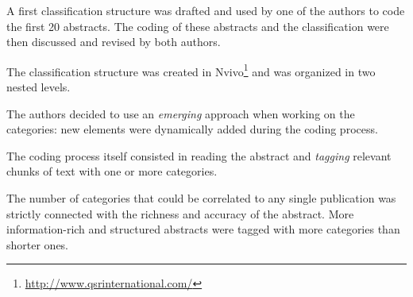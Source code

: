 A first classification structure was drafted and used by one of the authors to code the first 20 abstracts. The coding of these abstracts and the classification were then discussed and revised by both authors.

The classification structure was created in Nvivo\footnote{\url{http://www.qsrinternational.com/}} and was organized in two nested levels.

The authors decided to use an \textit{emerging} approach when working on the categories: new elements were dynamically added during the coding process.

The coding process itself consisted in reading the abstract and \textit{tagging} relevant chunks of text with one or more categories.

The number of categories that could be correlated to any single publication was strictly connected with the richness and accuracy of the abstract. More information-rich and structured abstracts were tagged with more categories than shorter ones.